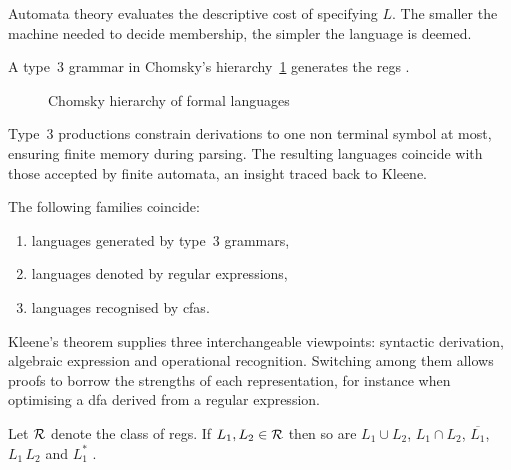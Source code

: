 Automata theory evaluates the descriptive cost of specifying $L$.  
The smaller the machine needed to decide membership, the simpler the language is deemed.  

\begin{concept}\label{concept:regular-grammar}
A type~3 grammar in Chomsky's hierarchy~\ref{fig:chomsky-hierarchy} generates the \glspl{reg} \cite{chomsky1959certain}.  
\end{concept}

\begin{figure}[h]
  \centering
  \caption{Chomsky hierarchy of formal languages}
  \label{fig:chomsky-hierarchy}
\end{figure}


Type~3 productions constrain derivations to one non terminal symbol at most,  
ensuring finite memory during parsing.  
The resulting languages coincide with those accepted by finite automata, an insight traced back to Kleene.  

\begin{theorem}\label{thm:kleene}
The following families coincide:
\begin{enumerate}
  \item languages generated by type~3 grammars,
  \item languages denoted by regular expressions,
  \item languages recognised by \glspl{cfa}.
\end{enumerate}
\cite{kleene1951representationof}
\end{theorem}

Kleene's theorem supplies three interchangeable viewpoints:  
syntactic derivation, algebraic expression and operational recognition.  
Switching among them allows proofs to borrow the strengths of each representation,  
for instance when optimising a \gls{dfa} derived from a regular expression.  

\begin{proposition}\label{prop:closure}
Let ${\cal R}$ denote the class of \glspl{reg}.  
If $L_{1},L_{2}\in{\cal R}$ then so are
$L_{1}\cup L_{2}$, $L_{1}\cap L_{2}$, $\overline{L_{1}}$,
$L_{1}\,L_{2}$ and $L_{1}^{\ast}$ \cite{hopcroft2001introduction}.  
\end{proposition}


